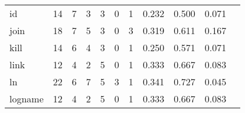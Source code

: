 \begin{longtable}{lp{1.2cm}p{1.2cm}p{1.2cm}p{1.2cm}p{1.2cm}p{1.2cm}p{1.2cm}p{1.2cm}p{1.2cm}p{1.2cm}}
id        &                                    14 &                                                  7 &                                                  3 &                                                  3 &                                                  0 &                                                  1 &                                              0.232 &                                              0.500 &                                              0.071 \\
join      &                                    18 &                                                  7 &                                                  5 &                                                  3 &                                                  0 &                                                  3 &                                              0.319 &                                              0.611 &                                              0.167 \\
kill      &                                    14 &                                                  6 &                                                  4 &                                                  3 &                                                  0 &                                                  1 &                                              0.250 &                                              0.571 &                                              0.071 \\
link      &                                    12 &                                                  4 &                                                  2 &                                                  5 &                                                  0 &                                                  1 &                                              0.333 &                                              0.667 &                                              0.083 \\
ln        &                                    22 &                                                  6 &                                                  7 &                                                  5 &                                                  3 &                                                  1 &                                              0.341 &                                              0.727 &                                              0.045 \\
logname   &                                    12 &                                                  4 &                                                  2 &                                                  5 &                                                  0 &                                                  1 &                                              0.333 &                                              0.667 &                                              0.083 \\

\end{longtable}
